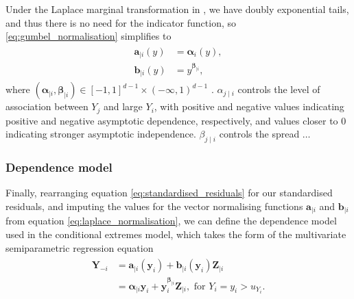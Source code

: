 \documentclass{article}
\numberwithin{equation}{section}
\begin{document}
Under the Laplace marginal transformation in \cite{Keef2013}, we have doubly exponential tails, and thus there is no need for the indicator function, so \ref{eq:gumbel_normalisation} simplifies to
\begin{align} \label{eq:laplace_normalisation}
  \begin{split}
    \bm{a}_{\mid i}(y) &= \bm{\alpha}_i(y), \\
    \bm{b}_{\mid i}(y) &= y^{\bm{\beta}_{\mid i}}, 
  \end{split}
\end{align}
where $(\bm{\alpha}_{\mid i}, \bm{\beta}_{\mid i}) \in [-1, 1]^{d-1} \times (-\infty, 1)^{d-1}$ \cite{Keef2013}. 
$\alpha_{j \mid i}$ controls the level of association between $Y_j$ and large $Y_i$, with positive and negative values indicating positive and negative asymptotic dependence, respectively, and values closer to 0 indicating stronger asymptotic independence. 
$\beta_{j \mid i}$ controls the spread $\ldots$ 

\subsubsection{Dependence model} \label{subsubsec:dep_model}


Finally, rearranging equation \ref{eq:standardised_residuals} for our standardised residuals, and imputing the values for the vector normalising functions $\bm{a}_{\mid i}$ and $\bm{b}_{\mid i}$ from equation \ref{eq:laplace_normalisation}, we can define the dependence model used in the conditional extremes model, which takes the form of the multivariate semiparametric regression equation
\begin{align} \label{eq:ce_model}
  \begin{split}
    \bm{Y}_{-i} &= \bm{a}_{\mid i}(\bm{y}_i) + \bm{b}_{\mid i}(\bm{y}_i)\bm{Z}_{\mid i} \\
                &= \bm{\alpha}_{\mid i}\bm{y}_i + \bm{y}_i^{\bm{\beta}_{\mid i}}\bm{Z}_{\mid i}, \text{ for } Y_i = y_i > u_{Y_i}.
  \end{split}
\end{align}
\end{document}

